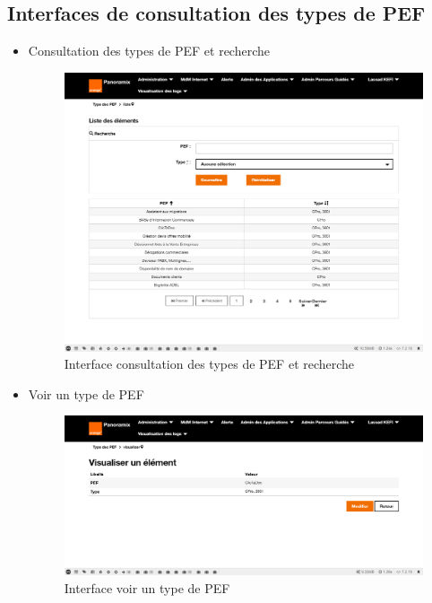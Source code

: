 \subsection{Interfaces de consultation des types de PEF}
\begin{itemize}
	\item Consultation des types de PEF et recherche
	\begin{figure}[H]
		\centering
		\includegraphics[width=0.5\linewidth]{img/screenshots/pef-type/index}
		\caption[Interface consultation des types de PEF et recherche]{Interface consultation des types de PEF et recherche}
		\label{fig:index-tp}
	\end{figure}
	
	\item Voir un type de PEF 
	\begin{figure}[H]
		\centering
		\includegraphics[width=0.5\linewidth]{img/screenshots/pef-type/view}
		\caption[Interface voir un type de PEF ]{Interface voir un type de PEF }
		\label{fig:view-tp}
	\end{figure}
\end{itemize}


